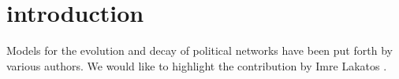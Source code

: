 \section{introduction}

Models for the evolution and decay of political networks have been put forth by various authors. We would like to highlight the contribution by Imre Lakatos \cite{lakatos1980}.